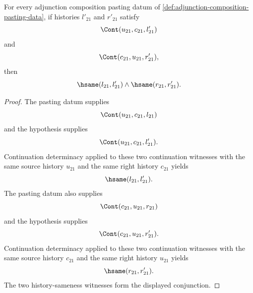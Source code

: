 \begin{corollary}
\label{cor:adjunction-composition-triangle-determinacy}
For every adjunction composition pasting datum of \autoref{def:adjunction-composition-pasting-data}, if histories $l'_{21}$ and $r'_{21}$ satisfy
$$
\Cont(u_{21},c_{21},l'_{21})
$$
and
$$
\Cont(c_{21},u_{21},r'_{21}),
$$
then
$$
\hsame(l_{21},l'_{21})\wedge \hsame(r_{21},r'_{21}).
$$
\end{corollary}
\begin{proof}
The pasting datum supplies
$$
\Cont(u_{21},c_{21},l_{21})
$$
and the hypothesis supplies
$$
\Cont(u_{21},c_{21},l'_{21}).
$$
Continuation determinacy applied to these two continuation witnesses with the same source history $u_{21}$ and the same right history $c_{21}$ yields
$$
\hsame(l_{21},l'_{21}).
$$
The pasting datum also supplies
$$
\Cont(c_{21},u_{21},r_{21})
$$
and the hypothesis supplies
$$
\Cont(c_{21},u_{21},r'_{21}).
$$
Continuation determinacy applied to these two continuation witnesses with the same source history $c_{21}$ and the same right history $u_{21}$ yields
$$
\hsame(r_{21},r'_{21}).
$$
The two history-sameness witnesses form the displayed conjunction.
\end{proof}

